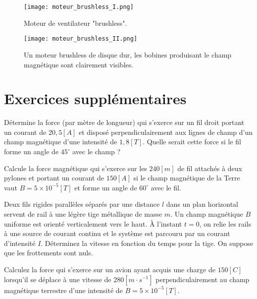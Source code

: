\begin{figure}[!ht]
    \centering
    \begin{minipage}[b]{.47\linewidth}
        \centering
        \texttt{[image: moteur\_brushless\_I.png]}
        \caption{Moteur de ventilateur "brushless".}
        \label{moteur_brushless_I}
    \end{minipage}
    \begin{minipage}[b]{.47\linewidth}
        \centering
        \texttt{[image: moteur\_brushless\_II.png]}
        \caption{Un moteur brushless de disque dur, les bobines produisant le champ magnétique sont clairement visibles.}
        \label{moteur_brushless_II}
    \end{minipage}
\end{figure}

\newpage

\section{Exercices supplémentaires}
\begin{exercise}
    Détermine la force (par mètre de longueur) qui s'exerce sur un fil droit portant un courant de \(20,5[A]\) et disposé perpendiculairement aux lignes de champ d'un champ magnétique d'une intensité de \(1,8 [T]\). Quelle serait cette force si le fil forme un angle de \(45^\circ\) avec le champ ?
\end{exercise}

\begin{exercise}
    Calcule la force magnétique qui s'exerce sur les \(240[m]\) de fil attachés à deux pylones et portant un courant de \(150[A]\) si le champ magnétique de la Terre vaut \(B=5 \times 10^{-5}[T]\) et forme un angle de \(60^\circ\) avec le fil.
\end{exercise}

\begin{exercise}
    Deux fils rigides parallèles séparés par une distance \(l\) dans un plan horizontal servent de rail à une légère tige métallique de masse \(m\). Un champ magnétique \(B\) uniforme est orienté verticalement vers le haut. À l'instant \(t=0\), on relie les rails à une source de courant continu et le système est parcouru par un courant d'intensité \(I\). Déterminez la vitesse en fonction du temps pour la tige. On suppose que les frottements sont nuls.
\end{exercise}

\begin{exercise}
    Calculez la force qui s'exerce sur un avion ayant acquis une charge de \(150[C]\) lorsqu'il se déplace à une vitesse de \(280[m \cdot s^{-1}]\) perpendiculairement au champ magnétique terrestre d'une intensité de \(B=5 \times 10^{-5}[T]\).
\end{exercise}

